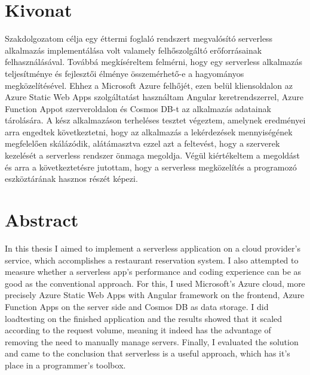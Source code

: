 \chapter*{Kivonat}

Szakdolgozatom célja egy éttermi foglaló rendszert megvalósító serverless alkalmazás implementálása volt valamely felhőszolgáltó erőforrásainak felhasználásával. Továbbá megkíséreltem felmérni, hogy egy serverless alkalmazás teljesítménye és fejlesztői élménye összemérhető-e a hagyományos megközelítésével. Ehhez a Microsoft Azure felhőjét, ezen belül kliensoldalon az Azure Static Web Apps szolgáltatást használtam Angular keretrendszerrel, Azure Function Appot szerveroldalon és Cosmos DB-t az alkalmazás adatainak tárolására. A kész alkalmazáson terheléses tesztet végeztem, amelynek eredményei arra engedtek következtetni, hogy az alkalmazás a lekérdezések mennyiségének megfelelően skálázódik, alátámasztva ezzel azt a feltevést, hogy a szerverek kezelését a serverless rendszer önmaga megoldja.
Végül kiértékeltem a megoldást és arra a következtetésre jutottam, hogy a serverless megközelítés a programozó eszköztárának hasznos részét képezi. 
\vfill

\chapter*{Abstract}

In this thesis I aimed to implement a serverless application on a cloud provider's service, which accomplishes a restaurant reservation system. I also attempted to measure whether a serverless app's performance and coding experience can be as good as the conventional approach. 
For this, I used Microsoft's Azure cloud, more precisely Azure Static Web Apps with Angular framework on the frontend, Azure Function Apps on the server side and Cosmos DB as data storage.
I did loadtesting on the finished application and the results showed that it scaled according to the request volume, meaning it indeed has the advantage of removing the need to manually manage servers.
Finally, I evaluated the solution and came to the conclusion that serverless is a useful approach, which has it's place in a programmer's toolbox.
\vfill

